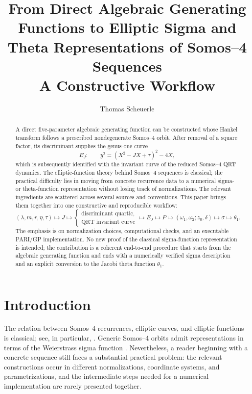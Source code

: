 \documentclass[11pt]{article}
\title{From Direct Algebraic Generating Functions to Elliptic Sigma and
Theta Representations of Somos--4 Sequences\\[0.4em]
\large A Constructive Workflow}
\author{Thomas Scheuerle}
\date{}
\newcommand{\taupar}{\tau}
\newcommand{\EJ}{E_J}
\begin{document}
\maketitle

\begin{abstract}
A direct five-parameter algebraic generating function can be constructed
whose Hankel transform follows a prescribed nondegenerate Somos--4 orbit.
After removal of a square factor, its discriminant supplies the genus-one
curve
\[
  \EJ:\qquad y^2=(X^2-JX+\taupar)^2-4X,
\]
which is subsequently identified with the invariant curve of the reduced
Somos--4 QRT dynamics.
The elliptic-function theory behind Somos--4 sequences is classical; the
practical difficulty lies in moving from concrete recurrence data to a
numerical sigma- or theta-function representation without losing track of
normalizations. The relevant ingredients are scattered across several
sources and conventions. This paper brings them together into one
constructive and reproducible workflow:
\[
 (\lambda,m,r,\eta,\taupar)
 \longmapsto J
 \longmapsto
 \begin{cases}
   \text{discriminant quartic},\\
   \text{QRT invariant curve}
 \end{cases}
 \longmapsto \EJ
 \longmapsto P
 \longmapsto (\omega_1,\omega_2;z_0,\delta)
 \longmapsto \sigma
 \longmapsto \theta_1.
\]
The emphasis is on normalization choices, computational checks, and an
executable PARI/GP implementation. No new proof of the classical
sigma-function representation is intended; the contribution is a coherent
end-to-end procedure that starts from the algebraic generating function and
ends with a numerically verified sigma description and an explicit conversion
to the Jacobi theta function $\theta_1$.
\end{abstract}

\section{Introduction}
The relation between Somos--4 recurrences, elliptic curves, and elliptic
functions is classical; see, in particular, \cite{Ward1948,Hone2005,
VanderPoortenSwart2006,HoneSwart2008}. Generic Somos--4 orbits admit
representations in terms of the Weierstrass sigma function
\cite{Hone2005}. Nevertheless, a reader beginning with a concrete sequence
still faces a substantial practical problem: the relevant constructions
occur in different normalizations, coordinate systems, and parametrizations,
and the intermediate steps needed for a numerical implementation are rarely
presented together.
\end{document}
